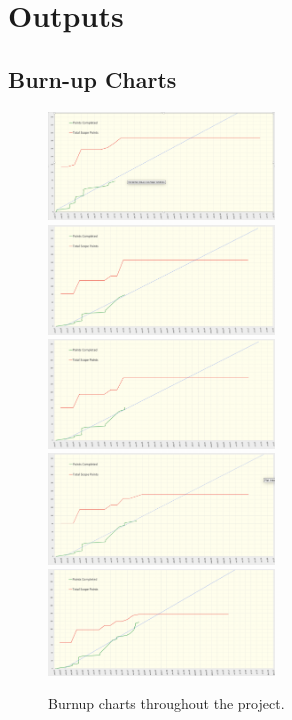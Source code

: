 \section{Outputs}

  \subsection{Burn-up Charts}
  \label{sec:burnup}

  \begin{figure}[H]
    \centering
    \includegraphics[width=6cm]{assets/outputs/burnups/01-16.png}
    \includegraphics[width=6cm]{assets/outputs/burnups/01-30.png}
    \includegraphics[width=6cm]{assets/outputs/burnups/02-05.png}
    \includegraphics[width=6cm]{assets/outputs/burnups/02-14.png}
    \includegraphics[width=6cm]{assets/outputs/burnups/02-27.png}
    \caption{Burnup charts throughout the project.}
    \label{fig:burnups}
  \end{figure}

